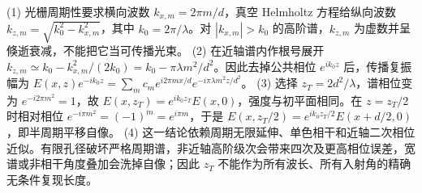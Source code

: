 (1) 光栅周期性要求横向波数 \(k_{x,m}=2\pi m/d\)，真空 Helmholtz 方程给纵向波数 \(k_{z,m}=\sqrt{k_0^2-k_{x,m}^2}\)，其中 \(k_0=2\pi/\lambda\)。对 \(|k_{x,m}|>k_0\) 的高阶谱，\(k_{z,m}\) 为虚数并呈倏逝衰减，不能把它当可传播光束。
(2) 在近轴谱内作根号展开 \(k_{z,m}\simeq k_0-k_{x,m}^2/(2k_0)=k_0-\pi\lambda m^2/d^2\)。因此去掉公共相位 \(e^{ik_0z}\) 后，传播复振幅为 \(E(x,z)e^{-ik_0z}=\sum_m c_m e^{i2\pi mx/d}e^{-i\pi\lambda m^2z/d^2}\)。
(3) 选择 \(z_T=2d^2/\lambda\)，谱相位变为 \(e^{-i2\pi m^2}=1\)，故 \(E(x,z_T)=e^{ik_0z_T}E(x,0)\)，强度与初平面相同。在 \(z=z_T/2\) 时相对相位 \(e^{-i\pi m^2}=(-1)^m=e^{i\pi m}\)，于是 \(E(x,z_T/2)=e^{ik_0z_T/2}E(x+d/2,0)\)，即半周期平移自像。
(4) 这一结论依赖周期无限延伸、单色相干和近轴二次相位近似。有限孔径破坏严格周期谱，非近轴高阶级次会带来四次及更高相位误差，宽谱或非相干角度叠加会洗掉自像；因此 \(z_T\) 不能作为所有波长、所有入射角的精确无条件复现长度。
